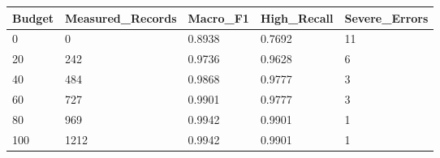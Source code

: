 \begin{tabular}{lllll}
\toprule
Budget & Measured\_Records & Macro\_F1 & High\_Recall & Severe\_Errors \\
\midrule
0 & 0 & 0.8938 & 0.7692 & 11 \\
20 & 242 & 0.9736 & 0.9628 & 6 \\
40 & 484 & 0.9868 & 0.9777 & 3 \\
60 & 727 & 0.9901 & 0.9777 & 3 \\
80 & 969 & 0.9942 & 0.9901 & 1 \\
100 & 1212 & 0.9942 & 0.9901 & 1 \\
\bottomrule
\end{tabular}